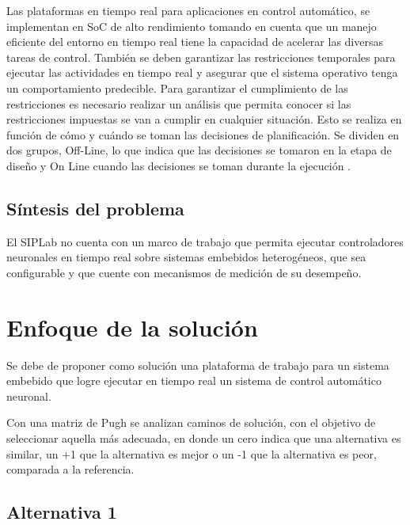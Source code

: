 \documentclass[12pt]{article}
\begin{document}
Las plataformas en tiempo real para aplicaciones en control automático, se implementan en SoC de alto rendimiento tomando en cuenta que un manejo eficiente del entorno en tiempo real tiene la capacidad de acelerar las diversas tareas de control. También se deben garantizar las restricciones temporales para ejecutar las actividades en tiempo real y asegurar que el sistema operativo tenga un comportamiento predecible. Para garantizar el cumplimiento de las restricciones es necesario realizar un análisis que permita conocer si las restricciones impuestas se van a cumplir en cualquier situación. Esto se realiza en función de cómo y cuándo se toman las decisiones de planificación. Se dividen en dos grupos, Off-Line, lo que indica que las decisiones se tomaron en la etapa de diseño y On Line cuando las decisiones se toman durante la ejecución \cite{munoz1994extensiones} \cite{alonso2010panoramica}.


\subsection{Síntesis del problema}

El SIPLab no cuenta con un marco de trabajo que permita ejecutar controladores neuronales en tiempo real sobre sistemas embebidos heterogéneos, que sea configurable y que cuente con mecanismos de medición de su desempeño.


\section{Enfoque de la solución}

Se debe de proponer como solución una plataforma de trabajo para un sistema embebido que logre ejecutar en tiempo real un sistema de control automático neuronal.


Con una matriz de Pugh se analizan caminos de solución, con el objetivo de seleccionar aquella más adecuada, en donde un cero indica que una alternativa es similar, un +1 que la alternativa es mejor o un -1 que la alternativa es peor, comparada a la referencia.

\subsection{Alternativa 1}

\end{document}
